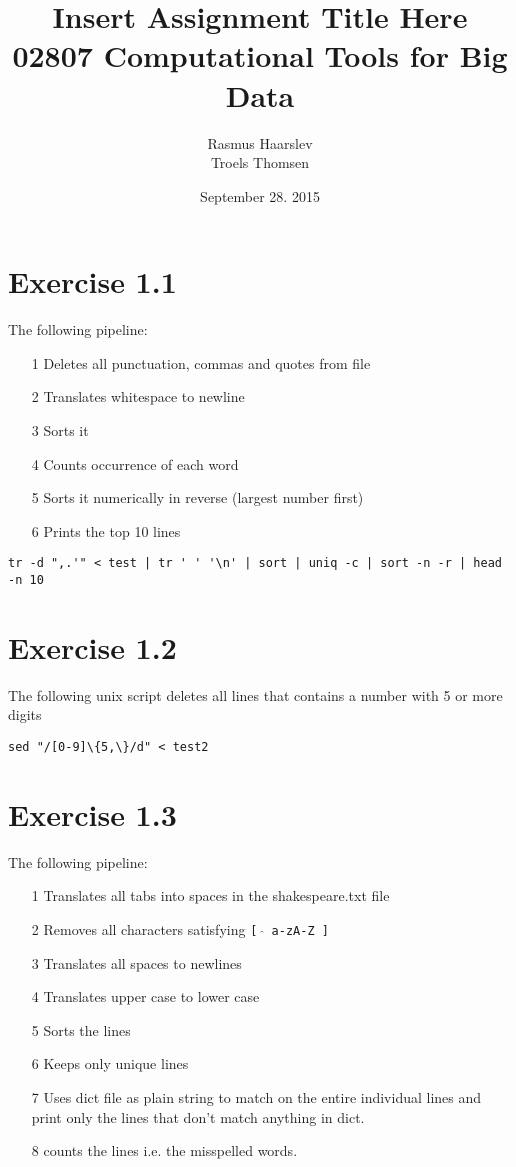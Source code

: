 \documentclass{article}
\title{Insert Assignment Title Here\\02807 Computational Tools for Big Data}
\author{Rasmus Haarslev\\ Troels Thomsen}
\date{September 28. 2015}
\begin{document}
\maketitle

\section{Exercise 1.1}

The following pipeline:
\begin{itemize}
\item[1] Deletes all punctuation, commas and quotes from file
\item[2] Translates whitespace to newline
\item[3] Sorts it
\item[4] Counts occurrence of each word
\item[5] Sorts it numerically in reverse (largest number first)
\item[6] Prints the top 10 lines
\end{itemize}

\begin{verbatim}
tr -d ",.'" < test | tr ' ' '\n' | sort | uniq -c | sort -n -r | head -n 10
\end{verbatim}

\section{Exercise 1.2}

The following unix script deletes all lines that contains a number with 5 or more digits

\begin{verbatim}
sed "/[0-9]\{5,\}/d" < test2
\end{verbatim}


\section{Exercise 1.3}

The following pipeline:
\begin{itemize}
\item[1] Translates all tabs into spaces in the shakespeare.txt file
\item[2] Removes all characters satisfying \texttt{[\ $\hat{}$\ a-zA-Z ]}
\item[3] Translates all spaces to newlines
\item[4] Translates upper case to lower case
\item[5] Sorts the lines
\item[6] Keeps only unique lines
\item[7] Uses dict file as plain string to match on the entire individual lines and print only the lines that don't match anything in dict.
\item[8] counts the lines i.e. the misspelled words.
\end{itemize}
\end{document}
